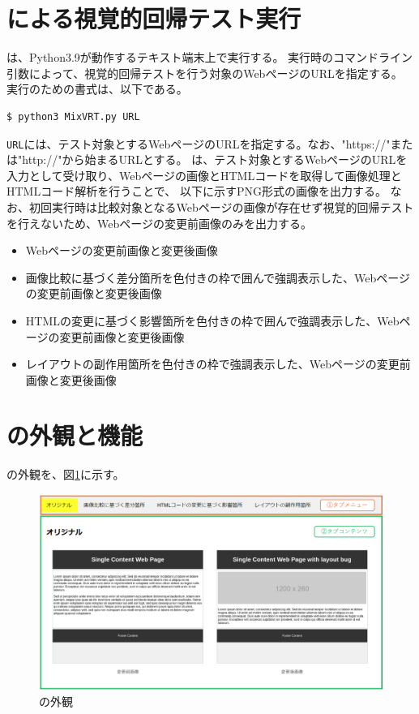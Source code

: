 \section{\toolName による視覚的回帰テスト実行}\label{sec:test_execution}
\toolName は、Python3.9\cite{Python}が動作するテキスト端末上で実行する。
\toolName 実行時のコマンドライン引数によって、視覚的回帰テストを行う対象のWebページのURLを指定する。
\toolName 実行のための書式は、以下である。
\begin{lstlisting}[label=list:command,frame=none,numbers=none,basicstyle={\normalsize \ttfamily \color[gray]{.15}}]
  $ python3 MixVRT.py URL
 \end{lstlisting}
{\tt URL}には、テスト対象とするWebページのURLを指定する。なお、"https://"または"http://"から始まるURLとする。
\toolName は、テスト対象とするWebページのURLを入力として受け取り、Webページの画像とHTMLコードを取得して画像処理とHTMLコード解析を行うことで、
以下に示すPNG形式の画像を出力する。
なお、\toolName 初回実行時は比較対象となるWebページの画像が存在せず視覚的回帰テストを行えないため、Webページの変更前画像のみを出力する。
\begin{itemize}
    \item Webページの変更前画像と変更後画像
    \item 画像比較に基づく差分箇所を色付きの枠で囲んで強調表示した、Webページの変更前画像と変更後画像
    \item HTMLの変更に基づく影響箇所を色付きの枠で囲んで強調表示した、Webページの変更前画像と変更後画像
    \item レイアウトの副作用箇所を色付きの枠で強調表示した、Webページの変更前画像と変更後画像
\end{itemize}


\section{\toolName の外観と機能}\label{sec:Appearance}
\toolName の外観を、図\ref{fig: Appearance}に示す。
\begin{figure}[tp]
    \begin{center}
        \includegraphics[width=1.0\columnwidth]{image/3_Appearance.png}
        \caption{\toolName の外観}
        \label{fig: Appearance}
    \end{center}
\end{figure}


